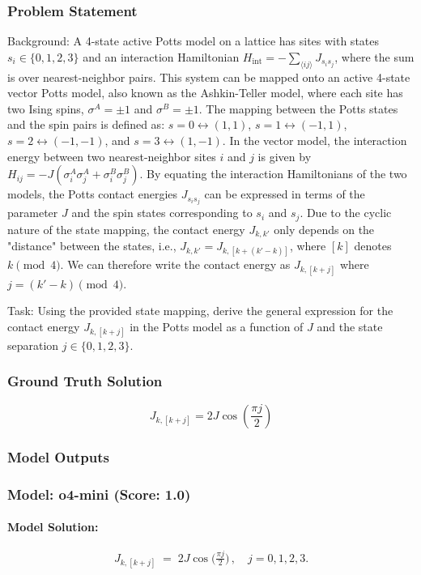 \documentclass[10pt]{article}
\begin{document}
\subsubsection*{Problem Statement}
Background:
A 4-state active Potts model on a lattice has sites with states $s_i \in \{0, 1, 2, 3\}$ and an interaction Hamiltonian $H_{\mathrm{int}} = - \sum_{\langle ij\rangle} J_{s_is_j}$, where the sum is over nearest-neighbor pairs. This system can be mapped onto an active 4-state vector Potts model, also known as the Ashkin-Teller model, where each site has two Ising spins, $\sigma^A = \pm 1$ and $\sigma^B = \pm 1$. The mapping between the Potts states and the spin pairs is defined as: $s=0 \leftrightarrow (1,1)$, $s=1 \leftrightarrow (-1,1)$, $s=2 \leftrightarrow (-1,-1)$, and $s=3 \leftrightarrow (1,-1)$. In the vector model, the interaction energy between two nearest-neighbor sites $i$ and $j$ is given by $H_{ij} = -J(\sigma_i^A \sigma_j^A + \sigma_i^B \sigma_j^B)$. By equating the interaction Hamiltonians of the two models, the Potts contact energies $J_{s_i s_j}$ can be expressed in terms of the parameter $J$ and the spin states corresponding to $s_i$ and $s_j$. Due to the cyclic nature of the state mapping, the contact energy $J_{k, k'}$ only depends on the "distance" between the states, i.e., $J_{k, k'} = J_{k, [k+(k'-k)]}$, where $[k]$ denotes $k \pmod 4$. We can therefore write the contact energy as $J_{k, [k+j]}$ where $j = (k'-k) \pmod 4$.

Task:
Using the provided state mapping, derive the general expression for the contact energy $J_{k, [k+j]}$ in the Potts model as a function of $J$ and the state separation $j \in \{0, 1, 2, 3\}$.

\subsubsection*{Ground Truth Solution}
\[ \boxed{J_{k,[k+j]} = 2J\cos\left(\frac{\pi j}{2}\right)} \]

\subsubsection*{Model Outputs}
\subsubsection*{Model: o4-mini (Score: 1.0)}
\paragraph*{Model Solution:}
\[ J_{k,[k+j]} \;=\; 2J\cos\!\bigl(\tfrac{\pi j}{2}\bigr)\,,\quad j=0,1,2,3. \]
\end{document}
